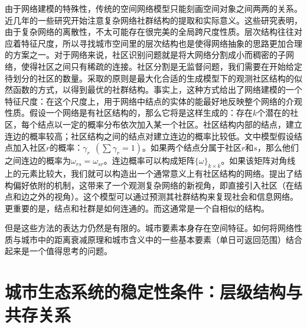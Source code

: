 由于网络建模的特殊性，传统的空间网络模型只能刻画空间对象之间两两的关系。近几年的一些研究\cite{newman2016estimating}开始注意复杂网络社群结构的提取和实际意义。这些研究表明，由于复杂网络的离散性，不太可能存在很完美的全局跨尺度性质。层次结构往往对应着特征尺度\cite{verma2016emergence}，所以寻找城市空间里的层次结构也是使得网络抽象的思路更加合理的方案之一。对于网络来说，社区识别问题就是将大网络分割成小而稠密的子网络，使得社区之间只有稀疏的连接。社区分割是无监督问题，我们需要在开始给定待划分的社区的数量。\cite{newman2016estimating}采取的原则是最大化合适的生成模型下的观测社区结构的似然函数的方式，以得到最优的社群结构。事实上，这种方式给出了网络建模的一个特征尺度：在这个尺度上，用于网络中结点的实体的能最好地反映整个网络的介观性质。假设一个网络是有社区结构的，那么它将是这样生成的：存在$k$个潜在的社区，每个结点以一定的概率分布依次加入某一个社区。社区结构内部的结点，建立连边的概率较高；社区结构之间的结点对建立连边的概率比较低。文中模型假设结点加入社区$r$的概率：$\gamma_r\ \ (\sum \gamma_r = 1)$。如果两个结点分属于社区$r$和$s$，那么他们之间连边的概率为$\omega_{rs}=\omega_{sr}$。连边概率可以构成矩阵$\{\omega\}_{k\times k}$。如果该矩阵对角线上的元素比较大，我们就可以构造出一个通常意义上有社区结构的网络。\cite{hebert2011structural}提出了结构偏好依附的机制，这带来了一个观测复杂网络的新视角，即直接引入社区（在结点和边之外的视角）。这个模型可以通过预测其社群结构来复现社会和信息网络。更重要的是，结点和社群是如何连通的。而这通常是一个自相似的结构。

但是这些方法的表达力仍然是有限的。城市要素本身存在空间特征。如何将网络性质与城市中的距离衰减原理和城市含义中的一些基本要素（单日可返回范围）结合起来是一个值得思考的问题。


\section{城市生态系统的稳定性条件：层级结构与共存关系}


